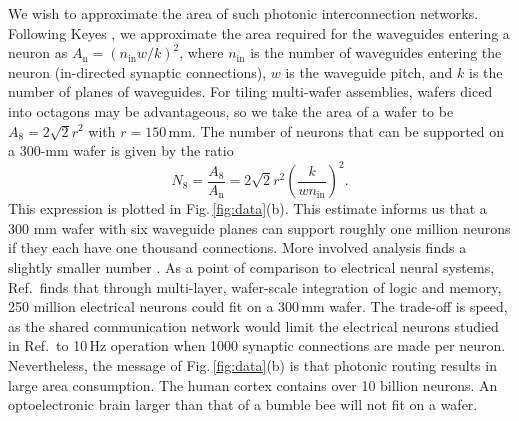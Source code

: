 \documentclass[twocolumn]{article}
\begin{document}
We wish to approximate the area of such photonic interconnection networks. Following Keyes \cite{ke1982}, we approximate the area required for the waveguides entering a neuron as $A_{\mathrm{n}} = (n_{\mathrm{in}} w/k)^2$, where $n_{\mathrm{in}}$ is the number of waveguides entering the neuron (in-directed synaptic connections), $w$ is the waveguide pitch, and $k$ is the number of planes of waveguides. For tiling multi-wafer assemblies, wafers diced into octagons may be advantageous, so we take the area of a wafer to be $A_8 = 2\sqrt{2}r^2$ with $r = 150$\,mm. The number of neurons that can be supported on a 300-mm wafer is given by the ratio
\begin{equation}
\label{eq:numNeuronPerWafer}
N_8 = \frac{A_8}{A_{\mathrm{n}}} = 2\sqrt{2}r^2\left(\frac{k}{wn_{\mathrm{in}}}\right)^2.
\end{equation}
This expression is plotted in Fig.\,\ref{fig:data}(b). This estimate informs us that a 300 mm wafer with six waveguide planes can support roughly one million neurons if they each have one thousand connections. More involved analysis finds a slightly smaller number \cite{sh2018e}. As a point of comparison to electrical neural systems, Ref.\,\cite{kuwa2017} finds that through multi-layer, wafer-scale integration of logic and memory, 250 million electrical neurons could fit on a 300\,mm wafer. The trade-off is speed, as the shared communication network would limit the electrical neurons studied in Ref.\,\cite{kuwa2017} to 10\,Hz operation when 1000 synaptic connections are made per neuron. Nevertheless, the message of Fig.\,\ref{fig:data}(b) is that photonic routing results in large area consumption. The human cortex contains over 10 billion neurons. An optoelectronic brain larger than that of a bumble bee will not fit on a wafer.
\end{document}
